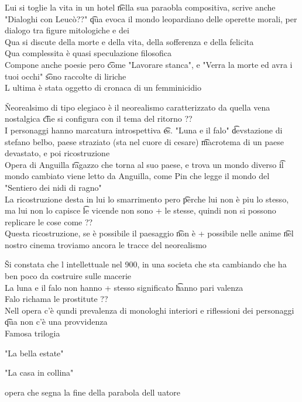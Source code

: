 \documentclass[12pt]{article}
\begin{document}
\v

Lui si toglie la vita in un hotel \t nella sua paraobla compositiva, scrive anche "Dialoghi con Leucò??" \t qua evoca il mondo leopardiano delle operette morali, per dialogo tra figure mitologiche e dei \\
Qua si discute della morte e della vita, della sofferenza e della felicita \\
Qua complessita è quasi speculazione filosofica \\
Compone anche poesie pero \t come "Lavorare stanca", e "Verra la morte ed avra i tuoi occhi" \t sono raccolte di liriche \\
L ultima è stata oggetto di cronaca di un femminicidio

\v

Neorealsimo di tipo elegiaco è il neorealismo caratterizzato da quella vena nostalgica \t che si configura con il tema del ritorno ?? \\
I personaggi hanno marcatura introspettiva \t es. "Luna e il falo" \t devstazione di stefano belbo, paese straziato (sta nel cuore di cesare) \t macrotema di un paese devastato, e poi ricostruzione \\
Opera di Anguilla \t ragazzo che torna al suo paese, e trova un mondo diverso \t il mondo cambiato viene letto da Anguilla, come Pin che legge il mondo del "Sentiero dei nidi di ragno" \\
La ricostruzione desta in lui lo smarrimento pero \t perche lui non è piu lo stesso, ma lui non lo capisce \t le vicende non sono + le stesse, quindi non si possono replicare le cose come ?? \\
Questa ricostruzione, se è possibile il paesaggio \t non è + possibile nelle anime \t nel nostro cinema troviamo ancora le tracce del neorealismo

\v

Si constata che l intellettuale nel 900, in una societa che sta cambiando che ha ben poco da costruire sulle macerie \\
La luna e il falo non hanno + stesso significato \t hanno pari valenza \\
Falo richama le prostitute ?? \\
Nell opera c'è qundi prevalenza di monologhi interiori e riflessioni dei personaggi \t qua non c'è una provvidenza \\
Famosa trilogia
\bi
  \item "La bella estate"
  \item "La casa in collina"
  \item opera che segna la fine della parabola dell uatore
\ei
\end{document}
